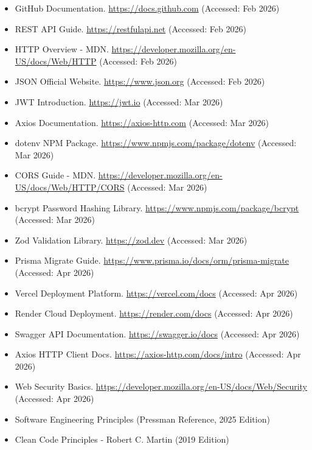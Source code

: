 \begin{itemize}
\item GitHub Documentation. \url{https://docs.github.com} (Accessed: Feb 2026)

\item REST API Guide. \url{https://restfulapi.net} (Accessed: Feb 2026)

\item HTTP Overview - MDN. \url{https://developer.mozilla.org/en-US/docs/Web/HTTP} (Accessed: Feb 2026)

\item JSON Official Website. \url{https://www.json.org} (Accessed: Feb 2026)

\item JWT Introduction. \url{https://jwt.io} (Accessed: Mar 2026)

\item Axios Documentation. \url{https://axios-http.com} (Accessed: Mar 2026)

\item dotenv NPM Package. \url{https://www.npmjs.com/package/dotenv} (Accessed: Mar 2026)

\item CORS Guide - MDN. \url{https://developer.mozilla.org/en-US/docs/Web/HTTP/CORS} (Accessed: Mar 2026)

\item bcrypt Password Hashing Library. \url{https://www.npmjs.com/package/bcrypt} (Accessed: Mar 2026)

\item Zod Validation Library. \url{https://zod.dev} (Accessed: Mar 2026)

\item Prisma Migrate Guide. \url{https://www.prisma.io/docs/orm/prisma-migrate} (Accessed: Apr 2026)

\item Vercel Deployment Platform. \url{https://vercel.com/docs} (Accessed: Apr 2026)

\item Render Cloud Deployment. \url{https://render.com/docs} (Accessed: Apr 2026)

\item Swagger API Documentation. \url{https://swagger.io/docs} (Accessed: Apr 2026)

\item Axios HTTP Client Docs. \url{https://axios-http.com/docs/intro} (Accessed: Apr 2026)

\item Web Security Basics. \url{https://developer.mozilla.org/en-US/docs/Web/Security} (Accessed: Apr 2026)

\item Software Engineering Principles (Pressman Reference, 2025 Edition)

\item Clean Code Principles - Robert C. Martin (2019 Edition)

\end{itemize}